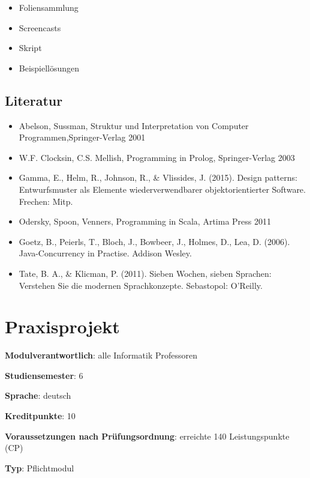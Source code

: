 \begin{itemize}
\tightlist
\item
  Foliensammlung
\item
  Screencasts
\item
  Skript
\item
  Beispiellösungen
\end{itemize}

\section*{Literatur\label{/mi-2017/modulbeschreibungen-bachelor/BA_Paradigmen-der-Programmierung}}\label{literaturpathlabelmi-2017modulbeschreibungen-bachelorbaux5fparadigmen-der-programmierung}

\begin{itemize}
\tightlist
\item
  Abelson, Sussman, Struktur und Interpretation von Computer
  Programmen,Springer-Verlag 2001
\item
  W.F. Clocksin, C.S. Mellish, Programming in Prolog, Springer-Verlag
  2003
\item
  Gamma, E., Helm, R., Johnson, R., \& Vlissides, J. (2015). Design
  patterns: Entwurfsmuster als Elemente wiederverwendbarer
  objektorientierter Software. Frechen: Mitp.
\item
  Odersky, Spoon, Venners, Programming in Scala, Artima Press 2011
\item
  Goetz, B., Peierls, T., Bloch, J., Bowbeer, J., Holmes, D., Lea, D.
  (2006). Java-Concurrency in Practise. Addison Wesley.
\item
  Tate, B. A., \& Klicman, P. (2011). Sieben Wochen, sieben Sprachen:
  Verstehen Sie die modernen Sprachkonzepte. Sebastopol: O'Reilly.
\end{itemize}

\chapter{Praxisprojekt\label{/mi-2017/modulbeschreibungen-bachelor/BA_Praxisprojektarbeit}}\label{praxisprojektpathlabelmi-2017modulbeschreibungen-bachelorbaux5fpraxisprojektarbeit}

\begin{modulHead}
\textbf{Modulverantwortlich}: alle Informatik
Professoren
\end{modulHead}
\begin{modulHead}
\textbf{Studiensemester}:
6
\end{modulHead}
\begin{modulHead}
\textbf{Sprache}:
deutsch
\end{modulHead}
\begin{modulHead}
\textbf{Kreditpunkte}:
10
\end{modulHead}
\begin{modulHead}
\textbf{Voraussetzungen nach
Prüfungsordnung}: erreichte 140 Leistungspunkte
(CP)
\end{modulHead}
\begin{modulHead}
\textbf{Typ}:
Pflichtmodul
\end{modulHead}


